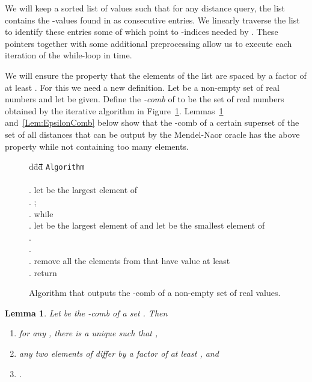 \documentclass[11pt]{article}
\newtheorem{Lem}{Lemma}
\begin{document}
We will keep a sorted list of values such that for any distance query, the list contains
the  -values found in  as consecutive entries. We linearly traverse the list to
identify these entries some of which point to -indices needed by . These pointers together with some
additional preprocessing allow us to execute each iteration of the while-loop in  time.

We will ensure the property that the elements of the list are spaced by a factor of at least . For this we need a new definition.
Let  be a non-empty set of real numbers and let  be given. Define the \emph{-comb} of 
to be the set  of real numbers obtained by the iterative algorithm  in Figure~\ref{fig:comb}.
Lemmas~\ref{Lem:Comb} and~\ref{Lem:EpsilonComb} below show that the -comb of a certain superset of the set of
all distances that can be output by the Mendel-Naor oracle has the above property while not containing too many elements.
\begin{figure}
\begin{tabbing}
d\=dd\=\quad\=\quad\=\quad\=\quad\=\quad\=\quad\=\quad\=\quad\=\quad\=\quad\=\quad\=\kill
\>\texttt{Algorithm} \\\\
. \>let  be the largest element of \\
. \>; \\
. \>while \\
. \>\>let  be the largest element of  and let  be
         the smallest element of \\
. \>\>\\
. \>\>\\
. \>\>remove all the elements from  that have value
         at least \\
. \>return 
\end{tabbing}
\caption{Algorithm that outputs the -comb  of a non-empty set  of real values.}\label{fig:comb}
\end{figure}
\begin{Lem}\label{Lem:Comb}
Let  be the -comb of a set . Then
\begin{enumerate}
\item for any , there is a unique  such that ,
\item any two elements of  differ by a factor of at least , and
\item .
\end{enumerate}
\end{Lem}
\end{document}
